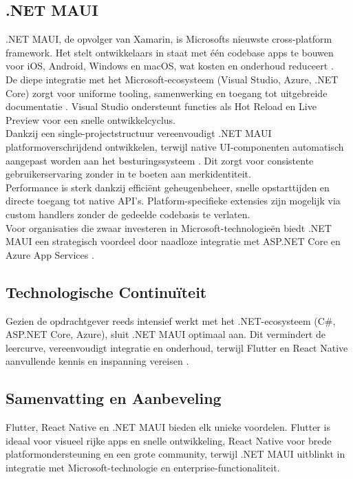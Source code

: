 \subsection{.NET MAUI}
.NET MAUI, de opvolger van Xamarin, is Microsofts nieuwste cross-platform framework. Het stelt ontwikkelaars in staat met één codebase apps te bouwen voor iOS, Android, Windows en macOS, wat kosten en onderhoud reduceert \autocite{Sheth2024}.\\

De diepe integratie met het Microsoft-ecosysteem (Visual Studio, Azure, .NET Core) zorgt voor uniforme tooling, samenwerking en toegang tot uitgebreide documentatie \autocite{Sheth2024}. Visual Studio ondersteunt functies als Hot Reload en Live Preview voor een snelle ontwikkelcyclus.\\

Dankzij een single-projectstructuur vereenvoudigt .NET MAUI platformoverschrijdend ontwikkelen, terwijl native UI-componenten automatisch aangepast worden aan het besturingssysteem \autocite{Sheth2024}. Dit zorgt voor consistente gebruikerservaring zonder in te boeten aan merkidentiteit.\\

Performance is sterk dankzij efficiënt geheugenbeheer, snelle opstarttijden en directe toegang tot native API’s. Platform-specifieke extensies zijn mogelijk via custom handlers zonder de gedeelde codebasis te verlaten.\\

Voor organisaties die zwaar investeren in Microsoft-technologieën biedt .NET MAUI een strategisch voordeel door naadloze integratie met ASP.NET Core en Azure App Services \autocite{Klesman2023}.

\subsection{Technologische Continuïteit}
Gezien de opdrachtgever reeds intensief werkt met het .NET-ecosysteem (C#, ASP.NET Core, Azure), sluit .NET MAUI optimaal aan. Dit vermindert de leercurve, vereenvoudigt integratie en onderhoud, terwijl Flutter en React Native aanvullende kennis en inspanning vereisen \autocite{Longe2025}.

\subsection{Samenvatting en Aanbeveling}
Flutter, React Native en .NET MAUI bieden elk unieke voordelen. Flutter is ideaal voor visueel rijke apps en snelle ontwikkeling, React Native voor brede platformondersteuning en een grote community, terwijl .NET MAUI uitblinkt in integratie met Microsoft-technologie en enterprise-functionaliteit.\\

